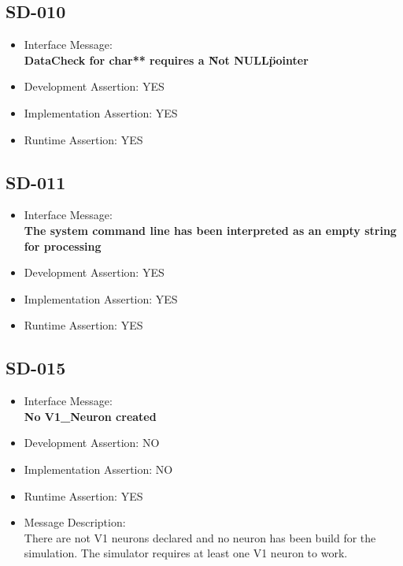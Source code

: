 \subsection{SD-010}
\begin{itemize}
  \item Interface Message:\\[1em]
    \textbf{DataCheck for char** requires a \"Not NULL\" pointer}
  \item Development Assertion: YES
  \item Implementation Assertion: YES
  \item Runtime Assertion: YES
\end{itemize}

\subsection{SD-011}
\begin{itemize}
  \item Interface Message:\\[1em]
    \textbf{The system command line has been interpreted as an empty string for processing}
  \item Development Assertion: YES
  \item Implementation Assertion: YES
  \item Runtime Assertion: YES
\end{itemize}

\subsection{SD-015}
\begin{itemize}
  \item Interface Message:\\[1em]
    \textbf{No V1\_Neuron created}
  \item Development Assertion: NO
  \item Implementation Assertion: NO
  \item Runtime Assertion: YES
  \item Message Description:\\[1em]
    There are not V1 neurons declared and no neuron has been build for the simulation. The simulator requires at least one V1 neuron to work.
\end{itemize}

